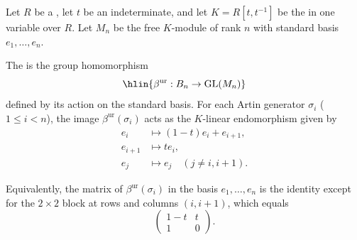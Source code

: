 \begin{definition} \label{definition:algebraic_unreduced_Burau_representation_of_artin_braid_group_on_a_module_over_a_ring}
    Let $R$ be a , let $t$ be an indeterminate, and let $K = R[t, t^{-1}]$ be the  in one variable over $R$. Let $M_n$ be the free $K$-module of rank $n$ with standard basis $e_1, \dots, e_n$.

    The  is the group homomorphism
    $$\hlin{\beta^{\mathrm{ur}}: B_n \to \operatorname{GL}(M_n)}$$
    defined by its action on the standard basis. For each Artin generator $\sigma_i$ ($1 \leq i < n$), the image $\beta^{\mathrm{ur}}(\sigma_i)$ acts as the $K$-linear endomorphism given by
    \begin{align*}
        e_i &\mapsto (1 - t)e_i + e_{i+1}, \\
        e_{i+1} &\mapsto t e_i, \\
        e_j &\mapsto e_j \quad (j \neq i, i+1).
    \end{align*}

    Equivalently, the matrix of $\beta^{\mathrm{ur}}(\sigma_i)$ in the basis $e_1, \dots, e_n$ is the identity except for the $2 \times 2$ block at rows and columns $(i, i+1)$, which equals
    $$\begin{pmatrix} 1 - t & t \\ 1 & 0 \end{pmatrix}.$$
\end{definition}
